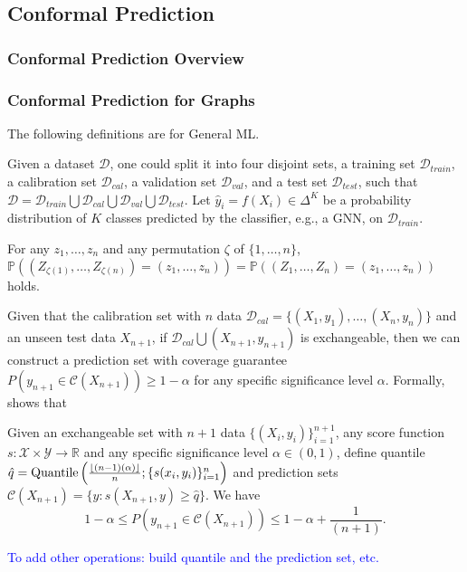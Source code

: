 \subsection{Conformal Prediction}
\subsubsection{Conformal Prediction Overview}













\subsubsection{Conformal Prediction for Graphs}
The following definitions are for General ML.

Given a dataset $\mathcal{D}$, one could split it into four disjoint sets, a training set $\mathcal{D}_{train}$, a calibration set $\mathcal{D}_{cal}$, a validation set $\mathcal{D}_{val}$, and a test set $\mathcal{D}_{test}$, such that $\mathcal{D} = \mathcal{D}_{train} \bigcup \mathcal{D}_{cal} \bigcup \mathcal{D}_{val} \bigcup \mathcal{D}_{test}$.
Let $\hat{y}_i= f(X_i) \in \Delta^K$ be a probability distribution of $K$ classes predicted by the classifier, e.g., a GNN, on $\mathcal{D}_{train}$.
% 

\begin{definition}[Exchangeability]
\label{def:exchangeability}
    For any $z_1, \dots, z_n$ and any permutation $\zeta$ of $\{1, \dots, n\}$, 
    $\mathbb{P} \left( (Z_{\zeta(1)}, \dots, Z_{\zeta(n)}) = (z_1, \dots, z_n) \right) = 
    \mathbb{P} \left( (Z_1, \dots, Z_n) = (z_1, \dots, z_n) \right)$ holds. 
\end{definition}

Given that the calibration set with $n$ data $\mathcal{D}_{cal}=\{ (X_1, y_1), \dots, (X_n, y_n) \}$ and an unseen test data $X_{n+1}$, if $\mathcal{D}_{cal} \bigcup {(X_{n+1}, y_{n+1})}$ is exchangeable, then we can construct a prediction set with coverage guarantee $P(y_{n+1}\in \mathcal{C}(X_{n+1})) \geq 1 - \alpha$ for any specific significance level $\alpha$.
Formally, \cite{vovk2005algorithmic} shows that
\begin{theorem}
    Given an exchangeable set with $n+1$ data $\{ (X_i, y_i)\}_{i=1}^{n+1}$, 
    any score function $s: \mathcal{X}\times \mathcal{Y}\to \mathbb{R}$ and any specific significance level $\alpha \in (0, 1)$,
    define quantile $\hat{q}=\textnormal{Quantile}\left( \frac{ \lfloor (n-1)(\alpha) \rfloor }{n}; \{ s(x_i, y_i) \}_{i=1}^n \right)$ and prediction sets 
    $\mathcal{C}(X_{n+1}) = \{ y: s(X_{n+1},y) \geq \hat{q} \}$.
    We have
    \begin{equation}
        1-\alpha \leq P \left( y_{n+1} \in \mathcal{C}(X_{n+1}) \right) \leq 1- \alpha + \frac{1}{(n+1)}.
    \end{equation}
\end{theorem}
\textcolor{blue}{To add other operations: build quantile and the prediction set, etc.}


